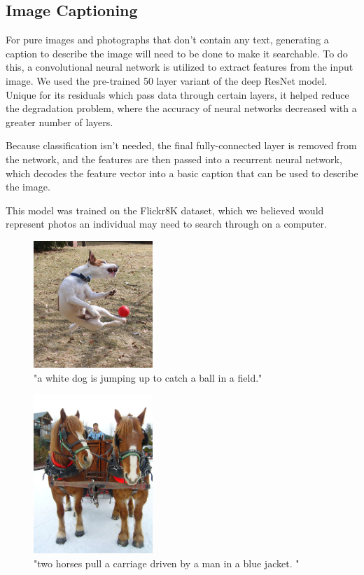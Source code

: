 \documentclass[11pt, a4paper, twocolumn]{article}
\begin{document}
\subsection{Image Captioning} 
For pure images and photographs that don’t contain any text, generating a caption to describe the image will need to be done to make it searchable. To do this, a convolutional neural network is utilized to extract features from the input image. We used the pre-trained 50 layer variant of the deep ResNet model. Unique for its residuals which pass data through certain layers, it helped reduce the degradation problem, where the accuracy of neural networks decreased with a greater number of layers. 

Because classification isn’t needed, the final fully-connected layer is removed from the network, and the features are then passed into a recurrent neural network, which decodes the feature vector into a basic caption that can be used to describe the image. 

This model was trained on the Flickr8K dataset, which we believed would represent photos an individual may need to search through on a computer.

\begin{figure}[htp]
    \centering
    \includegraphics[width=4.5cm]{128912885_8350d277a4.jpg}
    \caption{"a white dog is jumping up to catch a ball in a field."}
    \label{fig:cnn}
\end{figure}

\begin{figure}[htp]
    \centering
    \includegraphics[width=4.5cm]{109202801_c6381eef15.jpg}
    \caption{"two horses pull a carriage driven by a man in a blue jacket. "}
    \label{fig:cnn}
\end{figure}
\end{document}
